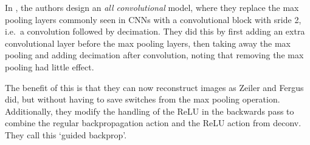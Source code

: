   In \cite{springenberg_striving_2014-3}, the authors design an \emph{all convolutional} model,
  where they replace the max pooling layers commonly seen in CNNs with a
  convolutional block with sride 2, i.e.\ a convolution followed by decimation.
  They did this by first adding an extra convolutional layer before the max
  pooling layers, then taking away the max pooling and adding decimation after
  convolution, noting that removing the max pooling had little effect. 

  The benefit of this is that they can now reconstruct images as Zeiler and
  Fergus did, but without having to save switches from the max pooling
  operation. Additionally, they modify the handling of the ReLU in the 
  backwards pass to combine the regular backpropagation action and the ReLU
  action from deconv. They call this `guided backprop'.
  
